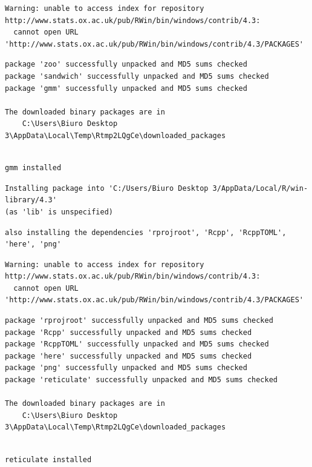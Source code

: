 \documentclass[
  11pt,
]{article}
\begin{document}
\begin{verbatim}
Warning: unable to access index for repository http://www.stats.ox.ac.uk/pub/RWin/bin/windows/contrib/4.3:
  cannot open URL 'http://www.stats.ox.ac.uk/pub/RWin/bin/windows/contrib/4.3/PACKAGES'
\end{verbatim}

\begin{verbatim}
package 'zoo' successfully unpacked and MD5 sums checked
package 'sandwich' successfully unpacked and MD5 sums checked
package 'gmm' successfully unpacked and MD5 sums checked

The downloaded binary packages are in
    C:\Users\Biuro Desktop 3\AppData\Local\Temp\Rtmp2LQgCe\downloaded_packages
\end{verbatim}

\begin{verbatim}

gmm installed
\end{verbatim}

\begin{verbatim}
Installing package into 'C:/Users/Biuro Desktop 3/AppData/Local/R/win-library/4.3'
(as 'lib' is unspecified)
\end{verbatim}

\begin{verbatim}
also installing the dependencies 'rprojroot', 'Rcpp', 'RcppTOML', 'here', 'png'
\end{verbatim}

\begin{verbatim}
Warning: unable to access index for repository http://www.stats.ox.ac.uk/pub/RWin/bin/windows/contrib/4.3:
  cannot open URL 'http://www.stats.ox.ac.uk/pub/RWin/bin/windows/contrib/4.3/PACKAGES'
\end{verbatim}

\begin{verbatim}
package 'rprojroot' successfully unpacked and MD5 sums checked
package 'Rcpp' successfully unpacked and MD5 sums checked
package 'RcppTOML' successfully unpacked and MD5 sums checked
package 'here' successfully unpacked and MD5 sums checked
package 'png' successfully unpacked and MD5 sums checked
package 'reticulate' successfully unpacked and MD5 sums checked

The downloaded binary packages are in
    C:\Users\Biuro Desktop 3\AppData\Local\Temp\Rtmp2LQgCe\downloaded_packages
\end{verbatim}

\begin{verbatim}

reticulate installed
\end{verbatim}
\end{document}
